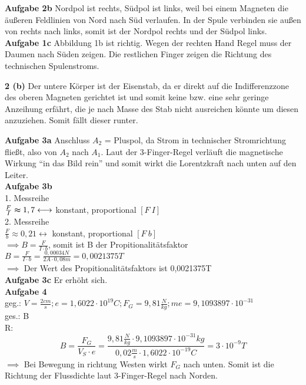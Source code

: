 \documentclass[a4paper]{report}
\begin{document}
\textbf{Aufgabe 2b} Nordpol ist rechts, Südpol ist links, weil bei einem
Magneten die äußeren Feldlinien von Nord nach Süd verlaufen. In der Spule
verbinden sie außen von rechts nach links, somit ist der Nordpol rechts und der
Südpol links.\\ \textbf{Aufgabe 1c} Abbildung 1b ist richtig. Wegen der rechten
Hand Regel muss der Daumen nach Süden zeigen. Die restlichen Finger zeigen die
Richtung des technischen Spulenstroms.



\noindent \textbf{2 (b)} Der untere Körper ist der Eisenstab, da er direkt auf
die Indifferenzzone des oberen Magneten gerichtet ist und somit keine bzw. eine
sehr geringe Anzeihung erfährt, die je nach Masse des Stab nicht ausreichen
könnte um diesen anzuziehen. Somit fällt dieser runter.

\noindent\textbf{Aufgabe 3a} Anschluss $A_2$ = Pluspol, da Strom in technischer
Stromrichtung fließt, also von $A_2$ nach $A_1$. Laut der 3-Finger-Regel
verläuft die magnetische Wirkung ``in das Bild rein'' und somit wirkt die
Lorentzkraft nach unten auf den Leiter.\\ \textbf{Aufgabe 3b}\\ 1. Messreihe\\
$\frac{F}{I}\thickapprox 1,7 \longleftrightarrow$ konstant, proportional
$[F~I]$\\ 2. Messreihe\\ $\frac{F}{b}\approx 0,21 \longleftrightarrow$
konstant, proportional $[F~b]$\\ $\implies B=\frac{F}{I\cdot b}$, somit ist B der
Propitionalitätsfaktor\\
$B=\frac{F}{I\cdot b}=\frac{0,00034N}{2A\cdot 0,08m}=0,0021375T$\\ $\implies$ Der Wert
des Propitionalitätsfaktors ist 0,0021375T\\ \textbf{Aufgabe 3c} Er erhöht
sich.\\ \textbf{Aufgabe 4}\\ geg.: $V=\frac{2cm}{s}; e=1,6022\cdot 10^{19}C;
F_G=9,81\frac{N}{kg}; me=9,1093897\cdot 10^{-31}$\\ ges.: B\\ R:
\[B=\frac{F_G}{V_S\cdot e}=\frac{9,81\frac{N}{kg}\cdot 9,1093897\cdot 10^{-31}kg}{0,02\frac{m}{s}\cdot 1,6022\cdot 10^{-19}C}=3\cdot 10^{-9}T\]
$\implies$ Bei Bewegung in richtung Westen wirkt $F_G$ nach unten. Somit ist
die Richtung der Flussdichte laut 3-Finger-Regel nach Norden. \clearpage
\end{document}
